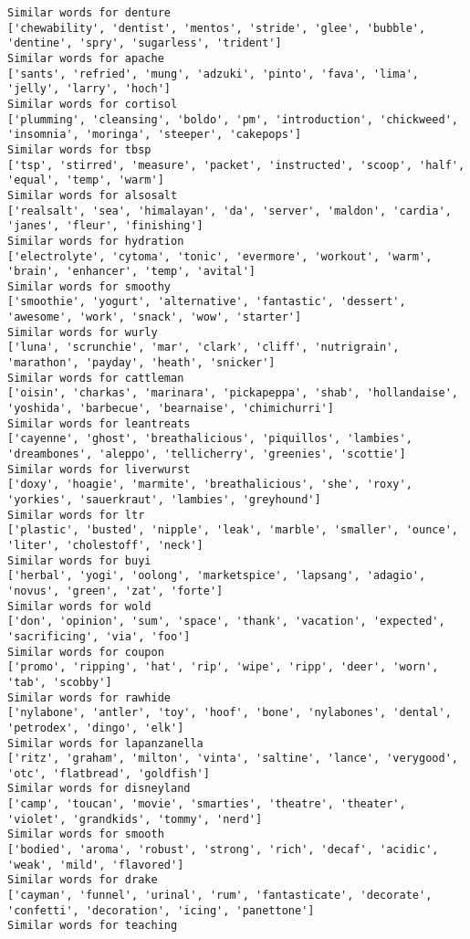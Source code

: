 \documentclass[11pt]{article}
\begin{document}
\begin{Verbatim}[commandchars=\\\{\}]
Similar words for denture
['chewability', 'dentist', 'mentos', 'stride', 'glee', 'bubble', 'dentine', 'spry', 'sugarless', 'trident']
Similar words for apache
['sants', 'refried', 'mung', 'adzuki', 'pinto', 'fava', 'lima', 'jelly', 'larry', 'hoch']
Similar words for cortisol
['plumming', 'cleansing', 'boldo', 'pm', 'introduction', 'chickweed', 'insomnia', 'moringa', 'steeper', 'cakepops']
Similar words for tbsp
['tsp', 'stirred', 'measure', 'packet', 'instructed', 'scoop', 'half', 'equal', 'temp', 'warm']
Similar words for alsosalt
['realsalt', 'sea', 'himalayan', 'da', 'server', 'maldon', 'cardia', 'janes', 'fleur', 'finishing']
Similar words for hydration
['electrolyte', 'cytoma', 'tonic', 'evermore', 'workout', 'warm', 'brain', 'enhancer', 'temp', 'avital']
Similar words for smoothy
['smoothie', 'yogurt', 'alternative', 'fantastic', 'dessert', 'awesome', 'work', 'snack', 'wow', 'starter']
Similar words for wurly
['luna', 'scrunchie', 'mar', 'clark', 'cliff', 'nutrigrain', 'marathon', 'payday', 'heath', 'snicker']
Similar words for cattleman
['oisin', 'charkas', 'marinara', 'pickapeppa', 'shab', 'hollandaise', 'yoshida', 'barbecue', 'bearnaise', 'chimichurri']
Similar words for leantreats
['cayenne', 'ghost', 'breathalicious', 'piquillos', 'lambies', 'dreambones', 'aleppo', 'tellicherry', 'greenies', 'scottie']
Similar words for liverwurst
['doxy', 'hoagie', 'marmite', 'breathalicious', 'she', 'roxy', 'yorkies', 'sauerkraut', 'lambies', 'greyhound']
Similar words for ltr
['plastic', 'busted', 'nipple', 'leak', 'marble', 'smaller', 'ounce', 'liter', 'cholestoff', 'neck']
Similar words for buyi
['herbal', 'yogi', 'oolong', 'marketspice', 'lapsang', 'adagio', 'novus', 'green', 'zat', 'forte']
Similar words for wold
['don', 'opinion', 'sum', 'space', 'thank', 'vacation', 'expected', 'sacrificing', 'via', 'foo']
Similar words for coupon
['promo', 'ripping', 'hat', 'rip', 'wipe', 'ripp', 'deer', 'worn', 'tab', 'scobby']
Similar words for rawhide
['nylabone', 'antler', 'toy', 'hoof', 'bone', 'nylabones', 'dental', 'petrodex', 'dingo', 'elk']
Similar words for lapanzanella
['ritz', 'graham', 'milton', 'vinta', 'saltine', 'lance', 'verygood', 'otc', 'flatbread', 'goldfish']
Similar words for disneyland
['camp', 'toucan', 'movie', 'smarties', 'theatre', 'theater', 'violet', 'grandkids', 'tommy', 'nerd']
Similar words for smooth
['bodied', 'aroma', 'robust', 'strong', 'rich', 'decaf', 'acidic', 'weak', 'mild', 'flavored']
Similar words for drake
['cayman', 'funnel', 'urinal', 'rum', 'fantasticate', 'decorate', 'confetti', 'decoration', 'icing', 'panettone']
Similar words for teaching

\end{Verbatim}
\end{document}
